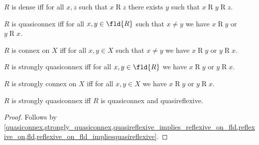 \begin{definition}\label{dense}
    $R$ is dense iff
    for all $x, z$ such that $x\mathrel{R}z$
        there exists $y$ such that $x\mathrel{R}y\mathrel{R}z$.
\end{definition}

\begin{definition}\label{quasiconnex}
    $R$ is quasiconnex iff
    for all $x, y\in\fld{R}$ such that $x\neq y$ we have
        $x\mathrel{R}y$ or $y\mathrel{R}x$.
\end{definition}

\begin{definition}\label{connex}
    $R$ is connex on $X$ iff
    for all $x, y\in X$ such that $x\neq y$ we have
        $x\mathrel{R}y$ or $y\mathrel{R}x$.
\end{definition}

\begin{definition}\label{strongly_quasiconnex}
    $R$ is strongly quasiconnex iff
    for all $x, y\in\fld{R}$ we have
        $x\mathrel{R}y$ or $y\mathrel{R}x$.
\end{definition}

\begin{definition}\label{strongly_connex}
    $R$ is strongly connex on $X$ iff
    for all $x, y\in X$ we have
        $x\mathrel{R}y$ or $y\mathrel{R}x$.
\end{definition}



\begin{proposition}\label{strongly_quasiconnex_iff_quasiconnex_and_quasireflexive}
    $R$ is strongly quasiconnex iff
    $R$ is quasiconnex and quasireflexive.
\end{proposition}
\begin{proof}
    Follows by \cref{quasiconnex,strongly_quasiconnex,quasireflexive_implies_reflexive_on_fld,reflexive_on,fld,reflexive_on_fld_impliesquasireflexive}.
\end{proof}

